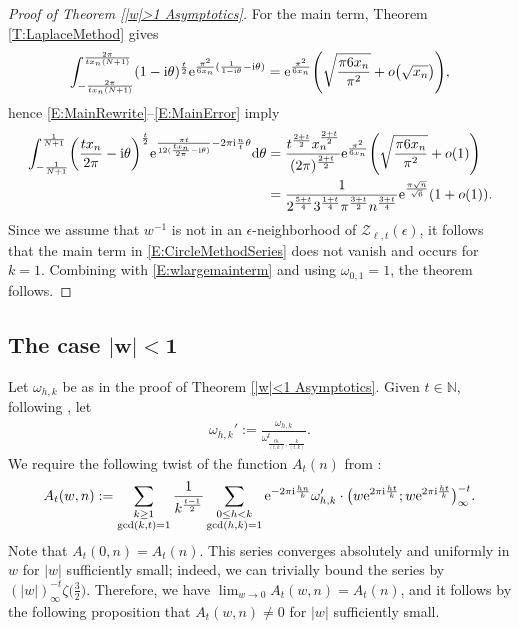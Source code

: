 \documentclass[pdftex]{sigma}
\numberwithin{equation}{section}
\begin{document}
\begin{proof}[Proof of Theorem \ref{|w|>1 Asymptotics}]
For the main term, Theorem \ref{T:LaplaceMethod} gives
\begin{equation}\label{E:MainError}
\int_{-\frac{2\pi}{tx_n(N+1)}}^{\frac{2\pi}{tx_n(N+1)}} (1-{\rm i}\theta)^{\frac{t}{2}}{\rm e}^{\frac{\pi^2}{6x_n}( \frac{1}{1-{\rm i}\theta}- {\rm i}\theta)}={\rm e}^{\frac{\pi^2}{6x_n}}\Biggl(\sqrt{\frac{\pi6x_n}{\pi^2}}+o\big( \sqrt{x_n}\big)\Biggr),
\end{equation}
hence \eqref{E:MainRewrite}--\eqref{E:MainError} imply
\begin{align}
 \int_{-\frac{1}{N+1}}^{\frac{1}{N+1}} \biggl(\frac{tx_n}{2\pi}-{\rm i}\theta\biggr)^{\frac{t}{2}}{\rm e}^{\frac{\pi t}{12(\frac{tx_n}{2\pi}-{\rm i}\theta)}-2\pi {\rm i} \frac{n}{t} \theta} {\rm d}\theta
 &{}=\frac{t^{\frac{2+t}{2}}x_n^{\frac{2+t}{2}}}{(2\pi)^{\frac{2+t}{2}}}{\rm e}^{\frac{\pi^2}{6x_n}}\Biggl(\sqrt{\frac{\pi6x_n}{\pi^2}}+o( 1) \Biggr) \nonumber \\
 &{}=\frac{1}{2^{\frac{5+t}{4}}3^{\frac{1+t}{4}}\pi^{\frac{3+t}{2}}n^{\frac{3+t}{4}}}{\rm e}^{\frac{\pi\sqrt{n}}{\sqrt{6}}}(1+o(1)). \label{E:wlargemainterm}
\end{align}
Since we assume that $w^{-1}$ is not in an $\epsilon$-neighborhood of $\mathcal{Z}_{\ell,t}(\epsilon)$, it follows that the main term in \eqref{E:CircleMethodSeries} does not vanish and occurs for $k=1$. Combining with \eqref{E:wlargemainterm} and using $\omega_{0,1}=1$, the theorem follows.
\end{proof}

\subsection[The case |w|<1]{The case $\boldsymbol{|w|<1}$} \label{S:smallw}

Let $\omega_{h,k}$ be as in the proof of Theorem \ref{|w|<1 Asymptotics}. Given $t \in \mathbb{N}$, following \cite[Theorem 5]{Anderson}, let
\begin{align*}%
 \omega_{h,k}':=\frac{\omega_{h,k}}{\omega_{\frac{th}{(t,k)},\frac{k}{(t,k)}}^t}.
\end{align*}
We require the following twist of the function $A_t(n)$ from \cite{Anderson}:
\begin{align} \label{A Definition}
 A_t(w,n):=\sum_{\substack{k \geq 1 \\ \gcd(k,t)=1}} \frac{1}{k^{\frac{t-1}{2}}}\sum_{\substack{0\leq h < k \\ \gcd(h,k)=1}}{\rm e}^{-2\pi {\rm i} \frac{hn}{k}}\omega'_{h,k}\cdot \big(w{\rm e}^{2\pi {\rm i} \frac{ht}{k}};w{\rm e}^{2\pi {\rm i} \frac{ht}{k}}\big)_{\infty}^{-t}.
\end{align} Note that $A_t(0,n)=A_t(n)$.
 This series converges absolutely and uniformly in $w$ for $|w|$ sufficiently small; indeed, we can trivially bound the series by $(|w|)_{\infty}^{-t}\zeta\big(\frac{3}{2}\big)$. Therefore, we have $\lim_{w \to 0} A_t(w,n)=A_t(n)$, and it follows by the following proposition that $A_t(w,n) \neq 0$ for $|w|$ sufficiently small.
\end{document}
